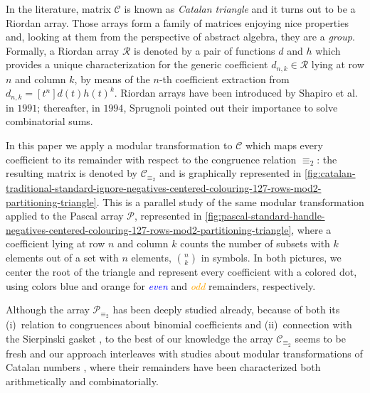 In the literature, matrix $\mathcal{C}$ is known as \emph{Catalan triangle} and
it turns out to be a Riordan array. Those arrays form a family of matrices
enjoying nice properties and, looking at them from the perspective of abstract
algebra, they are a \textit{group}. Formally, a Riordan array $\mathcal{R}$ is
denoted by a pair of functions $d$ and $h$ which provides a unique
characterization for the generic coefficient $d_{n,k}\in\mathcal{R}$ lying at
row $n$ and column $k$, by means of the $n$-th coefficient extraction from
$\displaystyle d_{n,k} = [t^{n}]d(t)h(t)^{k}$.
Riordan arrays have been introduced by Shapiro et al. \cite{shapiro:1991} in $1991$;
thereafter, in $1994$, Sprugnoli \cite{sprugnoli:1991} pointed out their importance
to solve combinatorial sums.

In this paper we apply a modular transformation to $\mathcal{C}$ which maps
every coefficient to its remainder with respect to the congruence relation
$\equiv_{2}$: the resulting matrix is denoted by $\mathcal{C}_{\equiv_{2}}$ and
is graphically represented in
\autoref{fig:catalan-traditional-standard-ignore-negatives-centered-colouring-127-rows-mod2-partitioning-triangle}.
This is a parallel study of the same modular transformation applied to the
Pascal array $\mathcal{P}$, represented in
\autoref{fig:pascal-standard-handle-negatives-centered-colouring-127-rows-mod2-partitioning-triangle},
where a coefficient lying at row $n$ and column $k$ counts the number of
subsets with $k$ elements out of a set with $n$ elements, ${{n}\choose{k}}$ in
symbols.  In both pictures, we center the root of the triangle and represent
every coefficient with a colored dot, using colors blue and orange for
\textcolor{blue}{\emph{even}} and \textcolor{orange}{\emph{odd}} remainders,
respectively.

Although the array $\mathcal{P}_{\equiv_{2}}$ has been deeply studied already,
because of both its (i)~relation to congruences about binomial coefficients and
(ii)~connection with the Sierpinski gasket \cite{sokolov,
stewart:four:encounters:sierpinski}, to the best of our knowledge the array
$\mathcal{C}_{\equiv_{2}}$ seems to be fresh and our approach interleaves with
studies about modular transformations of Catalan numbers
\cite{alter:kubota:prime:power:catalan:divisibility,
egecioglu:parity:via:lattice:paths,
konvalinka:divisibility:generalized:catalan:numbers}, where their remainders 
have been characterized both arithmetically and combinatorially.  

